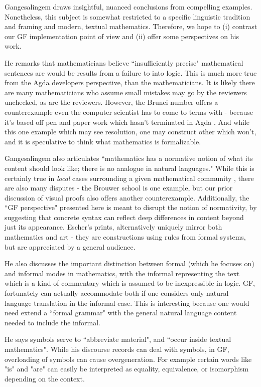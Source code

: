 Gangesalingem draws insightful, nuanced conclusions from compelling examples.
Nonetheless, this subject is somewhat restricted to a specific linguistic
tradition and framing and modern, textual mathematics. Therefore, we hope to (i)
contrast our GF implementation point of view and (ii) offer some perspectives on
his work.

He remarks that mathematicians believe ``insufficiently precise" mathematical
sentences are would be results from a failure to into logic. This is much more
true from the Agda developers perspective, than the mathematicians. It is likely
there are many mathematicians who assume small mistakes may go by the reviewers
unchecked, as are the reviewers. However, the Brunei number offers a
counterexample even the computer scientist has to come to terms with - because
it's based off pen and paper work which hasn't terminated in Agda
\cite{brunerie2016homotopy}. And while this one example which may see
resolution, one may construct other which won't, and it is speculative to think
what mathematics is formalizable.

Gangesalingem also articulates ``mathematics has a normative notion of what its
content should look like; there is no analogue in natural languages." While this
is certainly true in \emph{local} cases surrounding a given mathematical
community , there are also many disputes - the Brouwer school is one example,
but our prior discussion of visual proofs also offers another counterexample.
Additionally, the ``GF perspective" presented here is meant to disrupt the
notion of normativity, by suggesting that concrete syntax can reflect deep
differences in content beyond just its appearance. Escher's prints,
alternatively uniquely mirror both mathematics and art - they are constructions
using rules from formal systems, but are appreciated by a general audience.

He also discusses the important distinction between formal (which he focuses on)
and informal modes in mathematics, with the informal representing the text which
is a kind of commentary which is assumed to be inexpressible in logic. GF,
fortunately can actually accommodate both if one considers only natural language
translation in the informal case. This is interesting because one would need
extend a ``formal grammar" with the general natural language content needed to
include the informal.

He says symbols serve to ``abbreviate material", and ``occur inside textual
mathematics". While his discourse records can deal with symbols, in GF,
overloading of symbols can cause overgeneration. For example certain words like
"is" and "are" can easily be interpreted as equality, equivalence, or
isomorphism depending on the context.

